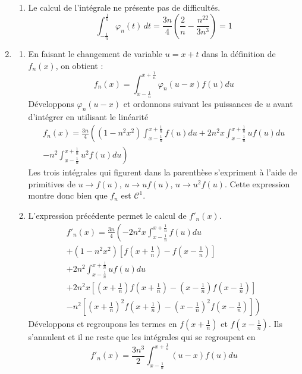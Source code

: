 \begin{enumerate}
\begin{enumerate}
\item Le calcul de l'intégrale ne présente pas de difficultés.
\begin{displaymath}
 \int_{-\frac{1}{n}}^{\frac{1}{n}}\varphi_n(t)\,dt = \frac{3n}{4}\left( \frac{2}{n}-\frac{n^22}{3n^3}\right) = 1
\end{displaymath}
\end{enumerate}
\item \begin{enumerate}
 \item En faisant le changement de variable $u=x+t$ dans la définition de $f_n(x)$, on obtient :
\begin{displaymath}
 f_n(x) = \int_{x-\frac{1}{n}}^{x+\frac{1}{n}}\varphi_n(u-x)f(u)du
\end{displaymath}
Développons $\varphi_n(u-x)$ et ordonnons suivant les puissances de $u$ avant d'intégrer en utilisant le linéarité
\begin{multline*}
 f_n(x) =\frac{3n}{4}\left( (1-n^2x^2)\int_{x-\frac{1}{n}}^{x+\frac{1}{n}}f(u)du 
+ 2n^2x \int_{x-\frac{1}{n}}^{x+\frac{1}{n}}uf(u)du \right.\\
\left.-n^2 \int_{x-\frac{1}{n}}^{x+\frac{1}{n}}u^2f(u)du\right)  
\end{multline*}
Les trois intégrales qui figurent dans la parenthèse s'expriment à l'aide de primitives de $u\rightarrow f(u)$, $u\rightarrow uf(u)$, $u\rightarrow u^2f(u)$. Cette expression montre donc bien que $f_n$ est $\mathcal C^1$.
\item  L'expression précédente permet le calcul de $f'_n(x)$.
\begin{multline*}
 f'_n(x)=\frac{3n}{4}\left(
-2n^2x \int_{x-\frac{1}{n}}^{x+\frac{1}{n}}f(u)du\right. \\
\left. +(1-n^2x^2)\left[ f(x+\frac{1}{n})- f(x-\frac{1}{n})\right]\right. \\
\left. +2n^2 \int_{x-\frac{1}{n}}^{x+\frac{1}{n}}uf(u)du \right. \\
\left. +2n^2x\left[ (x+\frac{1}{n})f(x+\frac{1}{n})- (x-\frac{1}{n})f(x-\frac{1}{n})\right]\right. \\
\left. -n^2\left[ (x+\frac{1}{n})^2f(x+\frac{1}{n})- (x-\frac{1}{n})^2f(x-\frac{1}{n})\right]
  \right) 
\end{multline*}
Développons et regroupons les termes en $f(x+\frac{1}{n})$ et $f(x-\frac{1}{n})$. Ils s'annulent et il ne reste que les intégrales qui se regroupent en
\begin{displaymath}
 f'_n(x)=\frac{3n^3}{2}\int_{x-\frac{1}{n}}^{x+\frac{1}{n}}(u-x)f(u)du

\end{displaymath}
\end{enumerate}
\end{enumerate}
